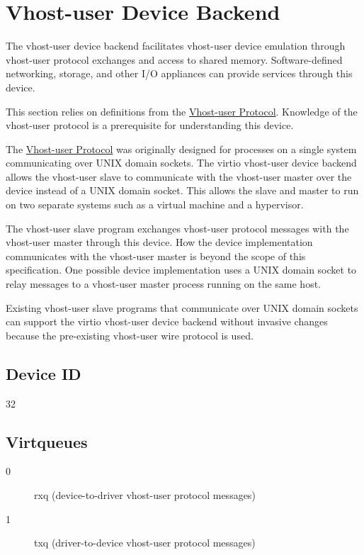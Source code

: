 \section{Vhost-user Device Backend}\label{sec:Device Types / Vhost-user Device Backend}

The vhost-user device backend facilitates vhost-user device emulation through
vhost-user protocol exchanges and access to shared memory.  Software-defined
networking, storage, and other I/O appliances can provide services through this
device.

This section relies on definitions from the \hyperref[intro:Vhost-user
Protocol]{Vhost-user Protocol}.  Knowledge of the vhost-user protocol is a
prerequisite for understanding this device.

The \hyperref[intro:Vhost-user Protocol]{Vhost-user Protocol} was originally
designed for processes on a single system communicating over UNIX domain
sockets.  The virtio vhost-user device backend allows the vhost-user slave to
communicate with the vhost-user master over the device instead of a UNIX domain
socket.  This allows the slave and master to run on two separate systems such
as a virtual machine and a hypervisor.

The vhost-user slave program exchanges vhost-user protocol messages with the
vhost-user master through this device.  How the device implementation
communicates with the vhost-user master is beyond the scope of this
specification.  One possible device implementation uses a UNIX domain socket to
relay messages to a vhost-user master process running on the same host.

Existing vhost-user slave programs that communicate over UNIX domain sockets
can support the virtio vhost-user device backend without invasive changes
because the pre-existing vhost-user wire protocol is used.

\subsection{Device ID}\label{sec:Device Types / Vhost-user Device Backend / Device ID}
  32

\subsection{Virtqueues}\label{sec:Device Types / Vhost-user Device Backend / Virtqueues}

\begin{description}
\item[0] rxq (device-to-driver vhost-user protocol messages)
\item[1] txq (driver-to-device vhost-user protocol messages)
\end{description}

